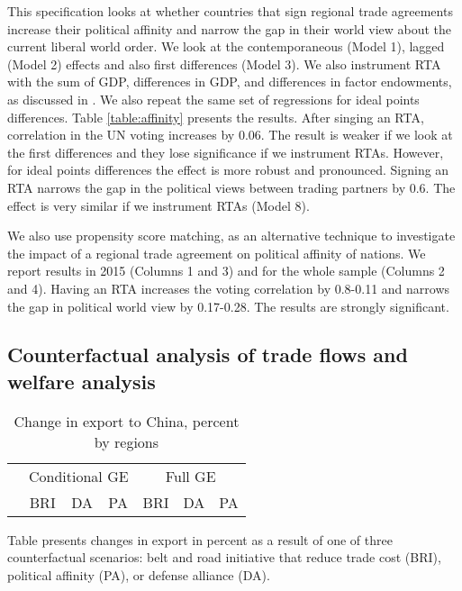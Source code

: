This specification looks at whether countries that sign regional trade agreements increase their political affinity and narrow the gap in their world view about the current liberal world order. We look at the contemporaneous (Model 1), lagged (Model 2) effects and also first differences (Model 3). We also instrument RTA with the sum of GDP, differences in GDP, and differences in factor endowments, as discussed in \cite{Baier2004}. We also repeat the same set of regressions for ideal points differences. Table \ref{table:affinity} presents the results. After singing an RTA, correlation in the UN voting increases by 0.06. The result is weaker if we look at the first differences and they lose significance if we instrument RTAs. However, for ideal points differences the effect is more robust and pronounced. Signing an RTA narrows the gap in the political views between trading partners by 0.6. The effect is very similar if we instrument RTAs (Model 8). 



We also use propensity score matching, as an alternative technique to investigate the impact of a regional trade agreement on political affinity of nations. We report results in 2015 (Columns 1 and 3) and for the whole sample (Columns 2 and 4). Having an RTA increases the voting correlation by 0.8-0.11 and narrows the gap in political world view by 0.17-0.28. The results are strongly significant.




\subsection{Counterfactual analysis of trade flows and welfare analysis}

\begin{table}
    \begin{threeparttable} 
    \centering
    \caption{Change in export to China, percent by regions}
    \label{tab:exp1}
    \begin{tabular}{lcccccc}
    \toprule
    &\multicolumn{3}{c}{Conditional GE}&\multicolumn{3}{c}{Full GE}\\
    & BRI & DA & PA & BRI & DA & PA \\
    \midrule
    
    \bottomrule
    \end{tabular}
    \begin{tablenotes}
    \item Table presents changes in export in percent as a result of one of three counterfactual scenarios: belt and road initiative that reduce trade cost (BRI), political affinity (PA), or defense alliance (DA).
    \end{tablenotes}
    \end{threeparttable}
\end{table}




